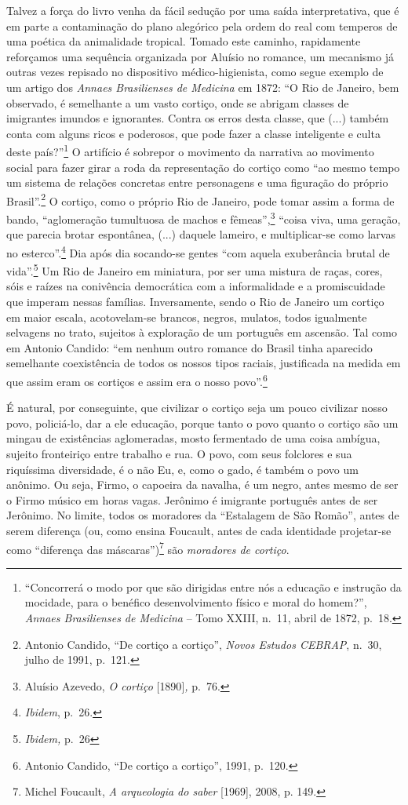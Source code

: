 Talvez a força do livro venha da fácil sedução por uma saída
interpretativa, que é em parte a contaminação do plano alegórico pela
ordem do real com temperos de uma poética da animalidade tropical.
Tomado este caminho, rapidamente reforçamos uma sequência organizada por
Aluísio no romance, um mecanismo já outras vezes repisado no dispositivo
médico-higienista, como segue exemplo de um artigo dos \emph{Annaes
Brasilienses de Medicina} em 1872: ``O Rio de Janeiro, bem observado, é
semelhante a um vasto cortiço, onde se abrigam classes de imigrantes
imundos e ignorantes. Contra os erros desta classe, que (...) também
conta com alguns ricos e poderosos, que pode fazer a classe inteligente
e culta deste país?''\footnote{``Concorrerá o modo por que são dirigidas
  entre nós a educação e instrução da mocidade, para o benéfico
  desenvolvimento físico e moral do homem?'', \emph{Annaes Brasilienses
  de Medicina} -- Tomo XXIII, n.~11, abril de 1872, p.~18.} O artifício
é sobrepor o movimento da narrativa ao movimento social para fazer girar
a roda da representação do cortiço como ``ao mesmo tempo um sistema de
relações concretas entre personagens e uma figuração do próprio
Brasil''.\footnote{Antonio Candido, ``De cortiço a cortiço'',
  \emph{Novos Estudos CEBRAP}, n.~30, julho de 1991, p.~121.} O cortiço,
como o próprio Rio de Janeiro, pode tomar assim a forma de bando,
``aglomeração tumultuosa de machos e fêmeas'',\footnote{Aluísio Azevedo,
  \emph{O cortiço} {[}1890{]}\emph{,} p.~76.} ``coisa viva, uma geração,
que parecia brotar espontânea, (...) daquele lameiro, e multiplicar-se
como larvas no esterco''.\footnote{\emph{Ibidem}, p.~26.} Dia após dia
socando-se gentes ``com aquela exuberância brutal de vida''.\footnote{\emph{Ibidem,}
  p.~26} Um Rio de Janeiro em miniatura, por ser uma mistura de raças,
cores, sóis e raízes na conivência democrática com a informalidade e a
promiscuidade que imperam nessas famílias. Inversamente, sendo o Rio de
Janeiro um cortiço em maior escala, acotovelam-se brancos, negros,
mulatos, todos igualmente selvagens no trato, sujeitos à exploração de
um português em ascensão. Tal como em Antonio Candido: ``em nenhum outro
romance do Brasil tinha aparecido semelhante coexistência de todos os
nossos tipos raciais, justificada na medida em que assim eram os
cortiços e assim era o nosso povo''.\footnote{Antonio Candido, ``De
  cortiço a cortiço'', 1991, p.~120.}

É natural, por conseguinte, que civilizar o cortiço seja um pouco
civilizar nosso povo, policiá-lo, dar a ele educação, porque tanto o
povo quanto o cortiço são um mingau de existências aglomeradas, mosto
fermentado de uma coisa ambígua, sujeito fronteiriço entre trabalho e
rua. O povo, com seus folclores e sua riquíssima diversidade, é o não
Eu, e, como o gado, é também o povo um anônimo. Ou seja, Firmo, o
capoeira da navalha, é um negro, antes mesmo de ser o Firmo músico em
horas vagas. Jerônimo é imigrante português antes de ser Jerônimo. No
limite, todos os moradores da ``Estalagem de São Romão'', antes de serem
diferença (ou, como ensina Foucault, antes de cada identidade
projetar-se como ``diferença das máscaras'')\footnote{Michel Foucault,
  \emph{A arqueologia do saber} {[}1969{]}, 2008, p. 149.} são
\emph{moradores de cortiço}.

